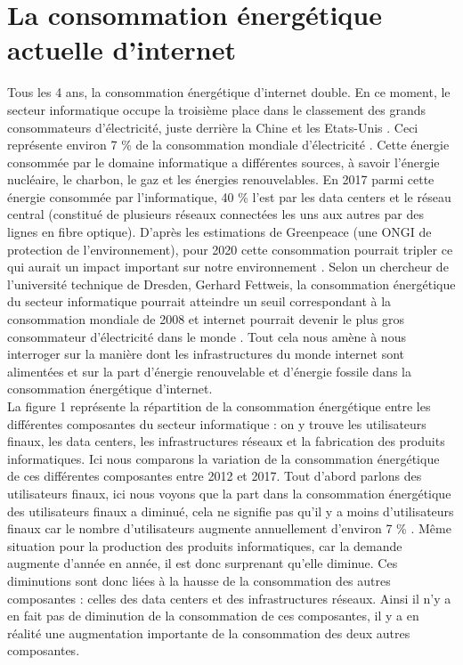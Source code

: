 \documentclass[a4paper,twocolumn,12pt]{article}
\begin{document}
\section{La consommation énergétique actuelle d'internet}

	Tous les 4 ans, la consommation énergétique d'internet double. En ce moment, le secteur informatique occupe la troisième place dans le classement des grands consommateurs d'électricité, juste derrière la Chine et les Etats-Unis \cite{2}. Ceci représente environ 7 \% de la consommation mondiale d’électricité \cite{3}. Cette énergie consommée par le domaine informatique a différentes sources, à savoir l’énergie nucléaire, le charbon, le gaz et les énergies renouvelables. En 2017 parmi cette énergie consommée par l’informatique, 40 \% l’est par les data centers et le réseau central (constitué de plusieurs réseaux connectées les uns aux autres par des lignes en fibre optique). D'après les estimations de Greenpeace (une ONGI de protection de l'environnement), pour 2020 cette consommation pourrait tripler ce qui aurait un impact important sur notre environnement \cite{3}. Selon un chercheur de l'université technique de Dresden, Gerhard Fettweis, la consommation énergétique du secteur informatique pourrait atteindre un seuil correspondant à la consommation mondiale de 2008 et internet pourrait devenir le plus gros consommateur d'électricité dans le monde \cite{2}. Tout cela nous amène à nous interroger sur la manière dont les infrastructures du monde internet sont alimentées et sur la part d'énergie renouvelable et d'énergie fossile dans la consommation énergétique d’internet. \\
	
	La figure 1 représente la répartition de la consommation énergétique entre les différentes composantes du secteur informatique : on y trouve les utilisateurs finaux, les data centers, les infrastructures réseaux et la fabrication des produits informatiques. Ici nous comparons la variation de la consommation énergétique de ces différentes composantes entre 2012 et 2017. Tout d’abord parlons des utilisateurs finaux, ici nous voyons que la part dans la consommation énergétique des utilisateurs finaux a diminué, cela ne signifie pas qu'il y a moins d’utilisateurs finaux car le nombre d’utilisateurs augmente annuellement d'environ 7 \% \cite{4}. Même situation pour la production des produits informatiques, car la demande augmente d’année en année, il est donc surprenant qu’elle diminue. Ces diminutions sont donc liées à la hausse de la consommation des autres composantes : celles des data centers et des infrastructures réseaux. Ainsi il n’y a en fait pas de diminution de la consommation de ces composantes, il y a en réalité une augmentation importante de la consommation des deux autres composantes.
\end{document}
